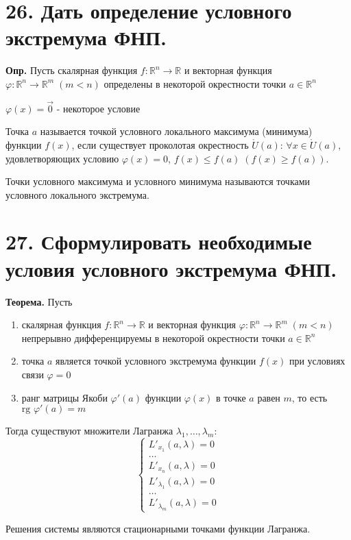 \documentclass[11pt]{article}
\begin{document}
\section*{26. Дать определение условного экстремума ФНП.}
\par\textbf{Опр.} Пусть скалярная функция $f: \mathbb{R}^{n} \to \mathbb{R}$ и векторная функция $\varphi: \mathbb{R}^{n} \to \mathbb{R}^m \; (m < n)$ определены в некоторой окрестности точки $a \in \mathbb{R}^n$
\par $\varphi(x) = \vec{0}$ - некоторое условие
\par Точка $a$ называется точкой условного локального максимума (минимума) функции $f(x)$, если существует проколотая окрестность $\mathring{U}(a)$: $\forall x \in \mathring{U}(a)$, удовлетворяющих условию $\varphi(x) = 0$, $f(x) \leq f(a) \; (f(x) \geq f(a))$.
\par Точки условного максимума и условного минимума называются точками условного локального экстремума.
\section*{27. Сформулировать необходимые условия условного экстремума ФНП.}
\par\textbf{Теорема.} Пусть
\begin{enumerate}
    \item  скалярная функция $f: \mathbb{R}^{n} \to \mathbb{R}$ и векторная функция $\varphi: \mathbb{R}^{n} \to \mathbb{R}^m \; (m < n)$ непрерывно дифференцируемы в некоторой окрестности точки $a \in \mathbb{R}^n$
    \item точка $a$ является точкой условного экстремума функции $f(x)$ при условиях связи $\varphi = 0$
    \item ранг матрицы Якоби $\varphi'(a)$ функции $\varphi(x)$ в точке $a$ равен $m$, то есть $\text{rg } \varphi'(a) = m$
\end{enumerate}
\par Тогда существуют множители Лагранжа $\lambda_{1}, \dots, \lambda_{m}$:
$$\left\{\begin{array}{l}
L'_{x_{1}} (a, \lambda) = 0 \\
\dots \\
L'_{x_{n}} (a, \lambda) = 0 \\
L'_{\lambda_{1}} (a, \lambda) = 0 \\
\dots \\
L'_{\lambda_{m}} (a, \lambda) = 0
\end{array}\right.$$
\par Решения системы являются стационарными точками функции Лагранжа.
\end{document}

